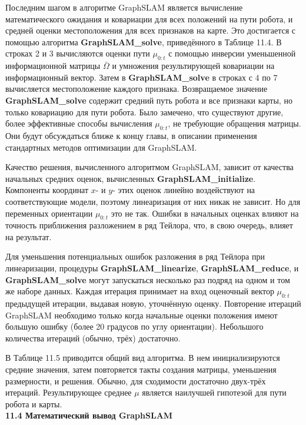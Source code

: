 \documentclass[10pt,a4paper]{article}
\begin{document}
Последним шагом в алгоритме GraphSLAM является вычисление математического ожидания и ковариации для всех положений на пути робота, и средней оценки местоположения для всех признаков на карте. Это достигается с помощью алгоритма \textbf{GraphSLAM\_solve}, приведённого в Таблице 11.4. В строках 2 и 3 вычисляются оценки пути $\mu_{0:t}$ с помощью инверсии уменьшенной информационной матрицы $\bar{\varOmega}$ и умножения результирующей ковариации на информационный вектор. Затем в \textbf{GraphSLAM\_solve} в строках с 4 по 7 вычисляется местоположение каждого признака. Возвращаемое значение \textbf{GraphSLAM\_solve} содержит средний путь робота и все признаки карты, но только ковариацию для пути робота. Было замечено, что существуют другие, более эффективные способы вычисления $\mu_{0:t}$, не требующие обращения матрицы. Они будут обсуждаться ближе к концу главы, в описании применения стандартных методов оптимизации для GraphSLAM.

Качество решения, вычисленного алгоритмом GraphSLAM, зависит от качества начальных средних оценок, вычисленных \textbf{GraphSLAM\_initialize}. Компоненты координат $x$- и $y$- этих оценок линейно воздействуют на соответствующие модели, поэтому линеаризация от них никак не зависит. Но для переменных ориентации $\mu_{0:t}$ это не так. Ошибки в начальных оценках влияют на точность приближения разложением в ряд Тейлора, что, в свою очередь, влияет на результат.

Для уменьшения потенциальных ошибок разложения в ряд Тейлора при линеаризации, процедуры \textbf{GraphSLAM\_linearize}, \textbf{GraphSLAM\_reduce}, и \textbf{GraphSLAM\_solve} могут запускаться несколько раз подряд на одном и том же наборе данных. Каждая итерация принимает на вход оценочный вектор $\mu_{0:t}$ предыдущей итерации, выдавая новую, уточнённую оценку. Повторение итераций GraphSLAM необходимо только когда начальные оценки положения имеют большую ошибку (более 20 градусов по углу ориентации). Небольшого количества итераций (обычно, трёх) достаточно.

В Таблице 11.5 приводится общий вид алгоритма. В нем инициализируются средние значения, затем повторяется такты создания матрицы, уменьшения размерности, и решения. Обычно, для сходимости достаточно двух-трёх итераций. Результирующее среднее $\mu$ является наилучшей гипотезой для пути робота и карты.\\

\textbf{11.4	Математический вывод GraphSLAM}\\
\end{document}
